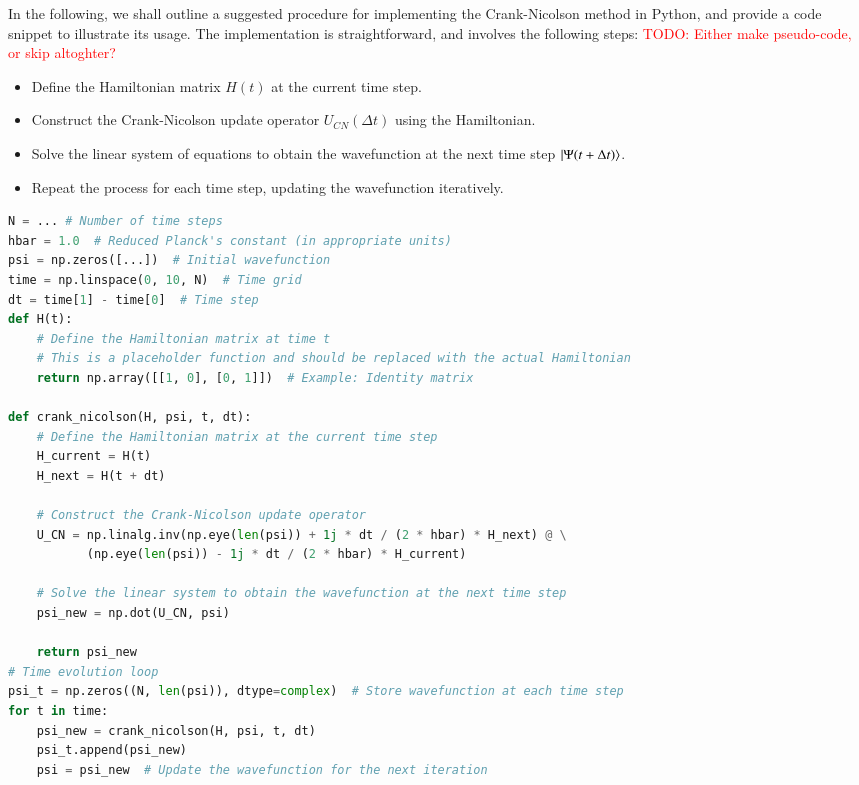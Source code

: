 \documentclass{subfiles}
\begin{document}
In the following, we shall outline a suggested procedure for implementing the Crank-Nicolson method in Python, and provide a code snippet to illustrate its usage. The implementation is straightforward, and involves the following steps: \textcolor{red}{TODO: Either make pseudo-code, or skip altoghter?}
\begin{itemize}
    \item Define the Hamiltonian matrix $H(t)$ at the current time step.
    \item Construct the Crank-Nicolson update operator $U_{CN}(\Delta t)$ using the Hamiltonian.
    \item Solve the linear system of equations to obtain the wavefunction at the next time step $\ket{\Psi(t + \Delta t)}$.
    \item Repeat the process for each time step, updating the wavefunction iteratively.
\end{itemize}
\begin{lstlisting}[language=Python]
N = ... # Number of time steps
hbar = 1.0  # Reduced Planck's constant (in appropriate units)
psi = np.zeros([...])  # Initial wavefunction
time = np.linspace(0, 10, N)  # Time grid
dt = time[1] - time[0]  # Time step
def H(t):
    # Define the Hamiltonian matrix at time t
    # This is a placeholder function and should be replaced with the actual Hamiltonian
    return np.array([[1, 0], [0, 1]])  # Example: Identity matrix

def crank_nicolson(H, psi, t, dt):
    # Define the Hamiltonian matrix at the current time step
    H_current = H(t)
    H_next = H(t + dt)
    
    # Construct the Crank-Nicolson update operator
    U_CN = np.linalg.inv(np.eye(len(psi)) + 1j * dt / (2 * hbar) * H_next) @ \
           (np.eye(len(psi)) - 1j * dt / (2 * hbar) * H_current)
    
    # Solve the linear system to obtain the wavefunction at the next time step
    psi_new = np.dot(U_CN, psi)
    
    return psi_new
# Time evolution loop
psi_t = np.zeros((N, len(psi)), dtype=complex)  # Store wavefunction at each time step
for t in time:
    psi_new = crank_nicolson(H, psi, t, dt)
    psi_t.append(psi_new)
    psi = psi_new  # Update the wavefunction for the next iteration
\end{lstlisting}
\end{document}

